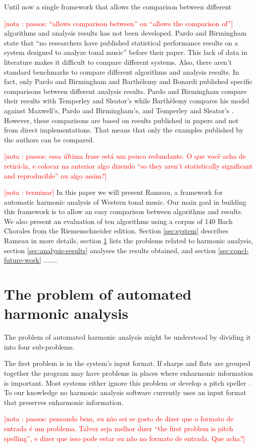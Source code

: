 \documentclass{article}
\newcounter{notacounter}
\newcommand{\nota}[1]{
  \addtocounter{notacounter}{1}
  \textcolor{red}{[nota \arabic{notacounter}: #1]}
}
\begin{document}
Until now a single framework that allows the comparison between
different \nota{passos: ``allows comparison between'' ou ``allows the
  comparison of''} algorithms and analysis results has not been
developed.  Pardo and Birmingham state that ``no researchers have
published statistical performance results on a system designed to
analyze tonal music'' \cite{pardo.ea:algorithms} before their
paper. This lack of data in literature makes it difficult to compare
different systems.  Also, there aren't standard benchmarks to compare
different algorithms and analysis results. In fact, only Pardo and
Birmingham \cite{pardo.ea:automated} and Barthèlemy and Bonardi
\cite{barthelemy.ea:figured} published specific comparisons between
different analysis results. Pardo and Birmingham compare their results
with Temperley and Sleator's \cite{temperley.ea:modeling} while
Barthèlemy compares his model against Maxwell's, Pardo and
Birmingham's, and Temperley and Sleator's
\cite{maxwell:expert,temperley:algorithm,pardo.ea:automated}.
However, these comparisons are based on results published in papers
and not from direct implementations. That means that only the examples
published by the authors can be compared. \nota{passos: essa última
  frase está um pouco redundante. O que você acha de retirá-la, e
  colocar na anterior algo dizendo ``so they aren't statistically
  significant and reproducible'' ou algo assim?}

\nota{terminar} In this paper we will present Rameau, a framework for
automatic harmonic analysis of Western tonal music. Our main goal in
building this framework is to allow an easy comparison between
algorithms and results. We also present an evaluation of ten
algorithms using a corpus of 140 Bach Chorales from the
Riemenschneider edition. Section \ref{sec:system} describes Rameau in
more details, section \ref{sec:problem} lists the problems related to
harmonic analysis, section \ref{sec:analysis-results} analyses the
results obtained, and section \ref{sec:concl-future-work} .......

\section{The problem of automated harmonic analysis}
\label{sec:problem}

The problem of automated harmonic analysis might be understood by
dividing it into four sub-problems. 

The first problem is in the system's input format. If sharps and flats
are grouped together the program may have problems in places where
enharmonic information is important. Most systems either ignore this
problem or develop a pitch speller \cite{temperley.ea:modeling}. To our
knowledge no harmonic analysis software currently uses an input format
that preserves enharmonic information. \nota{ passos: pensando bem, eu
  não sei se gosto de dizer que o formato de entrada é um
  problema. Talvez seja melhor dizer ``the first problem is pitch
  spelling'', e dizer que isso pode estar ou não no formato de
  entrada. Que acha?}
\end{document}
